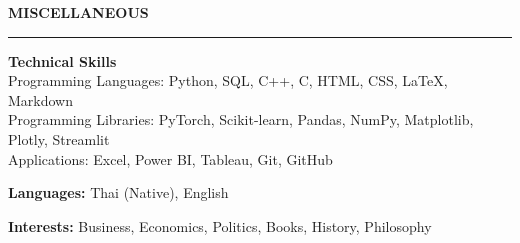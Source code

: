\documentclass[a4paper, 11pt]{article}
\begin{document}




\vspace{6pt}
\textbf{MISCELLANEOUS}
\vspace{5pt}
{\hrule}
\vspace{6pt}

\textbf{Technical Skills}\\
\hspace*{7pt} Programming Languages: Python, SQL, C++, C, HTML, CSS, LaTeX, Markdown\\
\hspace*{7pt} Programming Libraries: PyTorch, Scikit-learn, Pandas, NumPy, Matplotlib, Plotly, Streamlit\\
\hspace*{7pt} Applications: Excel, Power BI, Tableau, Git, GitHub

\textbf{Languages:} Thai (Native), English

\textbf{Interests:} Business, Economics, Politics, Books, History, Philosophy
\end{document}
